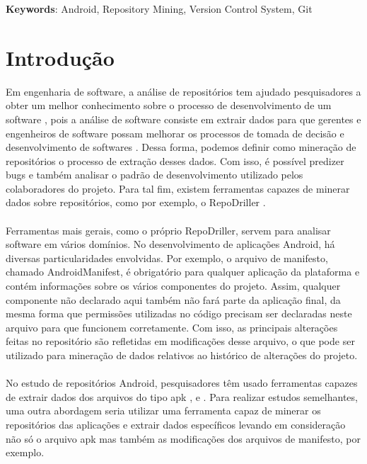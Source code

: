 \documentclass[a4paper,12pt]{article}
\begin{document}
\textbf{Keywords}: Android, Repository Mining, Version Control System, Git

\newpage

\tableofcontents

\newpage
\section{Introdução}

Em engenharia de software, a análise de repositórios tem ajudado pesquisadores a obter um melhor conhecimento sobre o processo de desenvolvimento de um software \cite{miningGit}, pois a análise de software consiste em extrair dados para que gerentes e engenheiros de software possam melhorar os processos de tomada de decisão e desenvolvimento de softwares \cite{soWhat}. Dessa forma, podemos definir como mineração de repositórios o processo de  extração desses dados. Com isso, é possível predizer bugs e também analisar o padrão de desenvolvimento utilizado pelos colaboradores do projeto. Para tal fim, existem ferramentas capazes de minerar dados sobre repositórios, como por exemplo, o RepoDriller \cite{repodriller}.\\
\\
Ferramentas mais gerais, como o próprio RepoDriller, servem para analisar software em vários domínios. No desenvolvimento de aplicações Android, há diversas particularidades envolvidas. Por exemplo, o arquivo de manifesto, chamado AndroidManifest, é obrigatório para qualquer aplicação da plataforma e contém informações sobre os vários componentes do projeto. Assim, qualquer componente não declarado aqui também não fará parte da aplicação final, da mesma forma que permissões utilizadas no código precisam ser declaradas neste arquivo para que funcionem corretamente. Com isso, as principais alterações feitas no repositório são refletidas em modificações desse arquivo, o que pode ser utilizado para mineração de dados relativos ao histórico de alterações do projeto.\\
\\
No estudo de repositórios Android, pesquisadores têm usado ferramentas capazes
de extrair dados dos arquivos do tipo apk \cite{Calciati}, \cite{WhoAdded} e \cite{YLyu}. Para realizar estudos
semelhantes, uma outra abordagem seria utilizar uma ferramenta capaz de
minerar os repositórios das aplicações e extrair dados específicos levando em
consideração não só o arquivo apk mas também as modificações dos arquivos de
manifesto, por exemplo.\\
\end{document}
